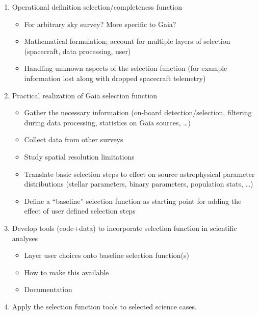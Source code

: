 \begin{enumerate}
    \item Operational definition selection/completeness function
        \begin{itemize}
            \item For arbitrary sky survey? More specific to Gaia?
            \item Mathematical formulation; account for multiple layers of selection (spacecraft, data processing, user)
            \item Handling unknown aspects of the selection function (for example information lost along with dropped
                spacecraft telemetry)
        \end{itemize}
    \item Practical realization of Gaia selection function
        \begin{itemize}
            \item Gather the necessary information (on-board detection/selection, filtering during data processing,
                statistics on Gaia sources, …)
            \item Collect data from other surveys
            \item Study spatial resolution limitations
            \item Translate basic selection steps to effect on source astrophysical parameter distributions (stellar
                parameters, binary parameters, population stats, …)
            \item Define a “baseline” selection function as starting point for adding the effect of user defined
                selection steps
        \end{itemize}
    \item Develop tools (code+data) to incorporate selection function in scientific analyses
        \begin{itemize}
            \item Layer user choices onto baseline selection function(s)
            \item How to make this available
            \item Documentation
        \end{itemize}
    \item Apply the selection function tools to selected science cases.
\end{enumerate}

